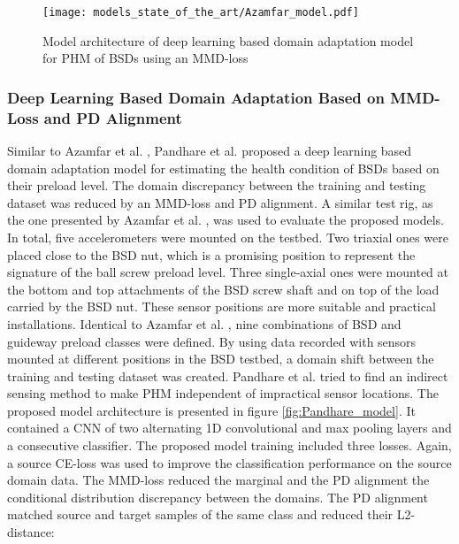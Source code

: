 \begin{figure}[H]
  \centering
  \texttt{[image: models\_state\_of\_the\_art/Azamfar\_model.pdf]}
  \caption{Model architecture of deep learning based domain adaptation model for PHM of BSDs using an MMD-loss \cite{AZAMFAR2020103932}}
  \label{fig:Azamfar_model}
\end{figure}


\subsubsection{Deep Learning Based Domain Adaptation Based on MMD-Loss and PD Alignment}
Similar to Azamfar et al. \cite{AZAMFAR2020103932}, Pandhare et al. \cite{Pandhare2021} proposed a deep learning based domain adaptation model for estimating the health condition of BSDs based on their preload level. The domain discrepancy between the training and testing dataset was reduced by an MMD-loss and PD alignment. A similar test rig, as the one presented by Azamfar et al. \cite{AZAMFAR2020103932}, was used to evaluate the proposed models. In total, five accelerometers were mounted on the testbed. Two triaxial ones were placed close to the BSD nut, which is a promising position to represent the signature of the ball screw preload level. Three single-axial ones were mounted at the bottom and top attachments of the BSD screw shaft and on top of the load carried by the BSD nut. These sensor positions are more suitable and practical installations. Identical to Azamfar et al. \cite{AZAMFAR2020103932}, nine combinations of BSD and guideway preload classes were defined. By using data recorded with sensors mounted at different positions in the BSD testbed, a domain shift between the training and testing dataset was created. Pandhare et al. \cite{Pandhare2021} tried to find an indirect sensing method to make PHM independent of impractical sensor locations. The proposed model architecture is presented in figure \ref{fig:Pandhare_model}. It contained a CNN of two alternating 1D convolutional and max pooling layers and a consecutive classifier. The proposed model training included three losses. Again, a source CE-loss was used to improve the classification performance on the source domain data. The MMD-loss reduced the marginal and the PD alignment the conditional distribution discrepancy between the domains. The PD alignment matched source and target samples of the same class and reduced their L2-distance: 

